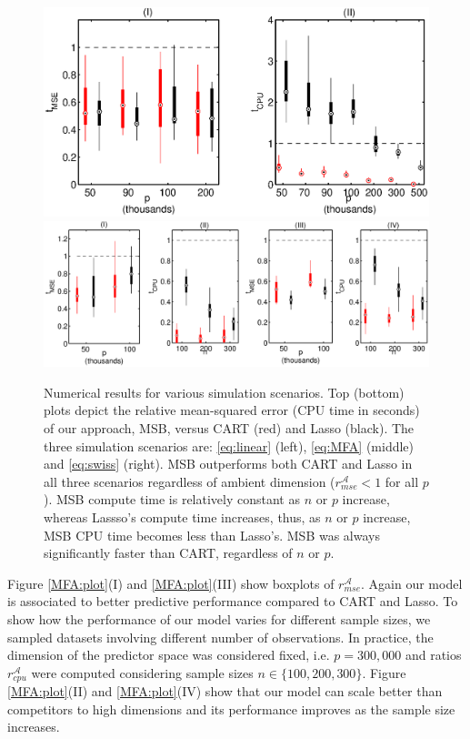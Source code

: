 \documentclass{article} %
\providecommand{\mc}[1]{\mathcal{#1}}
\begin{document}
\begin{figure}[h!]
\centering
 \vskip -0pt 
\includegraphics[width=.6\linewidth]{../figs/experiment1.eps} 
\includegraphics[width=0.8\linewidth]{../figs/nonlinear.eps} 

 \vskip -10pt 

\caption{Numerical results for various simulation scenarios.  Top (bottom) plots depict the relative mean-squared error (CPU time in seconds) of our approach, MSB, versus CART (red) and Lasso (black).  The three simulation scenarios are: \eqref{eq:linear} (left), \eqref{eq:MFA} (middle) and \eqref{eq:swiss} (right). MSB outperforms both CART and Lasso in all three scenarios regardless of ambient dimension ($r_{mse}^{\mc{A}}< 1$ for all $p$).  MSB compute time is relatively constant as $n$ or $p$ increase, whereas Lassso's compute time increases, thus, as $n$ or $p$ increase, MSB CPU time becomes less than Lasso's.  MSB was always significantly faster than CART, regardless of $n$ or $p$.} 
\label{fig:boxplots}
\end{figure}

 
Figure \ref{MFA:plot}(I) and  \ref{MFA:plot}(III)  show boxplots of $r_{mse}^{\mc{A}}$.  Again our model is associated to better predictive performance compared to CART and Lasso. To show how the performance of our model varies for different sample sizes,  we sampled datasets involving different number of observations. In practice, the dimension of the predictor space was considered fixed, i.e. $p=300,000$ and ratios $r^{\mc{A}}_{cpu}$ were computed considering sample sizes $n \in \{100,200,300 \}$. Figure \ref{MFA:plot}(II) and  \ref{MFA:plot}(IV) show that our model can scale better than competitors to high dimensions and its performance improves as the sample size increases. 
\end{document}
